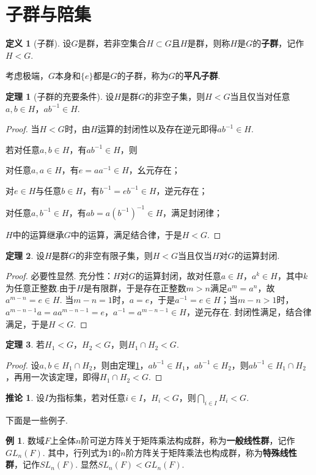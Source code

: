 \documentclass[12pt]{ctexart}
\theoremstyle{definition}
\newtheorem{definition}{定义}[section]
\newtheorem{theorem}{定理}[section]
\newtheorem{corollary}{推论}[section]
\newtheorem{example}{例}[section]
\theoremstyle{plain}
\begin{document}
\section{子群与陪集}
\begin{definition}[子群]
	设$G$是群，若非空集合$H\subset G$且$H$是群，则称$H$是$G$的\textbf{子群}，记作$H<G$.
\end{definition}
考虑极端，$G$本身和$\{e\}$都是$G$的子群，称为$G$的\textbf{平凡子群}.
\begin{theorem}[子群的充要条件]\label{iff}
	设$H$是群$G$的非空子集，则$H<G$当且仅当对任意$a,b\in H$，$ab^{-1}\in H$.
\end{theorem}
\begin{proof}
	当$H<G$时，由$H$运算的封闭性以及存在逆元即得$ab^{-1}\in H$.
	
	若对任意$a,b\in H$，有$ab^{-1}\in H$，则
	
	对任意$a,a\in H$，有$e=aa^{-1}\in H$，幺元存在；
	
	对$e\in H$与任意$b\in H$，有$b^{-1}=eb^{-1}\in H$，逆元存在；
	
	对任意$a,b^{-1}\in H$，有$ab=a(b^{-1})^{-1}\in H$，满足封闭律；
	
	$H$中的运算继承$G$中的运算，满足结合律，于是$H<G$.
\end{proof}
\begin{theorem}
	设$H$是群$G$的非空有限子集，则$H<G$当且仅当$H$对$G$的运算封闭.
\end{theorem}
\begin{proof}
	必要性显然. 充分性：$H$对$G$的运算封闭，故对任意$a\in H$，$a^k\in H$，其中$k$为任意正整数.由于$H$是有限群，于是存在正整数$m>n$满足$a^m=a^n$，故$a^{m-n}=e\in H$. 当$m-n=1$时，$a=e$，于是$a^{-1}=e\in H$；当$m-n>1$时，$a^{m-n-1}a=aa^{m-n-1}=e$，$a^{-1}=a^{m-n-1}\in H$，逆元存在. 封闭性满足，结合律满足，于是$H<G$.
\end{proof}
\begin{theorem}
	若$H_1<G$，$H_2<G$，则$H_1\cap H_2<G$.
\end{theorem}
\begin{proof}
	设$a,b\in H_1\cap H_2$，则由定理\ref{iff}，$ab^{-1}\in H_1$，$ab^{-1}\in H_2$，则$ab^{-1}\in H_1\cap H_2$，再用一次该定理，即得$H_1\cap H_2<G$.
\end{proof}
\begin{corollary}
	设$I$为指标集，若对任意$i\in I$，$H_i<G$，则$\bigcap_{i\in I}H_i<G$.
\end{corollary}
下面是一些例子.
\begin{example}
	数域$F$上全体$n$阶可逆方阵关于矩阵乘法构成群，称为\textbf{一般线性群}，记作$GL_n(F)$. 其中，行列式为$1$的$n$阶方阵关于矩阵乘法也构成群，称为\textbf{特殊线性群}，记作$SL_n(F)$. 显然$SL_n(F)<GL_n(F)$.
\end{example}
\end{document}
